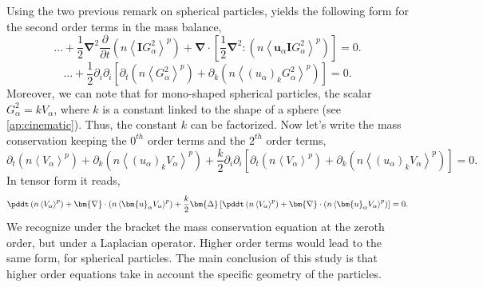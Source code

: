 Using the two previous remark on spherical particles, yields the following form for the second order terms in the mass balance,
\begin{equation}
    \ldots +
    \frac{1}{2}  \bm{\nabla}^2
    \frac{\partial }{\partial t}\left(
          n \left<\bm{I}G_\alpha^2\right>^p
    \right) 
    + \bm{\nabla}\cdot\left[
        \frac{1}{2} \bm{\nabla}^{2} : (n \left< \bm{u}_\alpha \bm{I}G_\alpha^2\right>^p)
    \right] = 0.
\end{equation}
\begin{equation}
    \ldots +
    \frac{1}{2}  \partial_i\partial_i
    \left[
        \partial_t\left(
            n \left<G_\alpha^2\right>^p
            \right)
        + \partial_k
        \left(
            n \left< (u_\alpha)_k G_\alpha^2\right>^p
        \right)
    \right]
    = 0.
\end{equation}
Moreover, we can note that for mono-shaped spherical particles, the scalar $G_\alpha^2 = k V_\alpha$, where $k$ is a constant linked to the shape of a sphere (see \ref{ap:cinematic}).
Thus, the constant $k$ can be factorized. 
Now let's write the mass conservation keeping the $0^{th}$ order terms and the $2^{th}$ order terms, 
\begin{equation}
    \partial_t\left(
        n \left<V_\alpha\right>^p
        \right)
    + \partial_k
    \left(
        n \left< (u_\alpha)_k V_\alpha\right>^p
    \right)
    +
    \frac{k}{2}  \partial_i\partial_i
    \left[
        \partial_t\left(
            n \left<V_\alpha\right>^p
            \right)
        + \partial_k
        \left(
            n \left< (u_\alpha)_k V_\alpha\right>^p
        \right)
    \right]
    = 0.
\end{equation}
In tensor form it reads, 
\begin{equation}
    \pddt\left(
        n \left<V_\alpha\right>^p
        \right)
    + \bm{\nabla}\cdot
    \left(
        n \left< \bm{u}_\alpha V_\alpha\right>^p
    \right)
    +
    \frac{k}{2}  \bm{\Delta}
    \left[
        \pddt\left(
            n \left<V_\alpha\right>^p
            \right)
        + \bm{\nabla}\cdot
        \left(
            n \left< \bm{u}_\alpha V_\alpha\right>^p
        \right)
    \right]
    = 0.
\end{equation}
We recognize under the bracket the mass conservation equation at the zeroth order, but under a Laplacian operator. 
Higher order terms would lead to the same form, for spherical particles.
The main conclusion of this study is that higher order equations take in account the specific geometry of the particles. 
